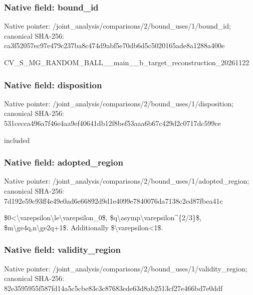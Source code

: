 \documentclass[10pt,a4paper]{article}
\begin{document}
\subsubsection{Native field: bound\_id}


Native pointer: /joint\_analysis/comparis\allowbreak{}ons/2/bound\_uses/1/bound\allowbreak{}\_id; canonical SHA-256: ca3f52057ec97e479c237ba8\allowbreak{}c474d9abf5e70db6d5c50201\allowbreak{}65ade8a1288a400e


CV\_S\_MG\_RANDOM\_BALL\_\_mai\allowbreak{}n\_\_b\_target\_reconstructi\allowbreak{}on\_20261122


\subsubsection{Native field: disposition}


Native pointer: /joint\_analysis/comparis\allowbreak{}ons/2/bound\_uses/1/dispo\allowbreak{}sition; canonical SHA-256: 531cecca496a7f46e4aa9ef4\allowbreak{}0641db12f8bef53aaa6b67c4\allowbreak{}29d2c0717dc599ce


included


\subsubsection{Native field: adopted\_region}


Native pointer: /joint\_analysis/comparis\allowbreak{}ons/2/bound\_uses/1/adopt\allowbreak{}ed\_region; canonical SHA-256: 7d192e59c93ff4e49e0ad6e6\allowbreak{}6892d9d1e4099e7840076da7\allowbreak{}138c2ed87fbea41c


\$0<\textbackslash{}varepsilon\textbackslash{}le\textbackslash{}varepsilon\_0\$, \$q\textbackslash{}asymp\textbackslash{}varepsilon\textasciicircum{}\{2/3\}\$, \$m\textbackslash{}ge4q,n\textbackslash{}ge2q+1\$. Additionally \$\textbackslash{}varepsilon<1\$.


\subsubsection{Native field: validity\_region}


Native pointer: /joint\_analysis/comparis\allowbreak{}ons/2/bound\_uses/1/valid\allowbreak{}ity\_region; canonical SHA-256: 82e3595955f587fd14a5c5cb\allowbreak{}e83c3c87683ede63d8ab2513\allowbreak{}cf27e466bd7e0ddf
\end{document}
